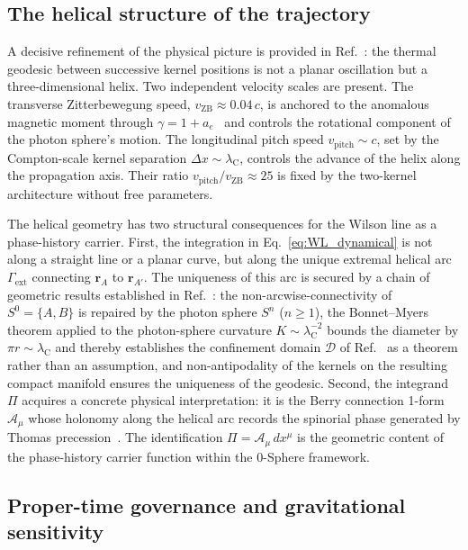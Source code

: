 \documentclass[%
 reprint, amsmath,amssymb, aps, prb, ]{revtex4-2}
\numberwithin{equation}{section}
\newcommand{\lambdaC}{\lambda_{\mathrm{C}}}
\newcommand{\vZB}{v_{\mathrm{ZB}}}
\begin{document}
\subsection{The helical structure of the trajectory}

A decisive refinement of the physical picture is provided in Ref.~\cite{hanamura51}: the thermal geodesic between successive kernel positions is not a planar oscillation but a three-dimensional helix. Two independent velocity scales are present. The transverse Zitterbewegung speed, $\vZB \approx 0.04\,c$, is anchored to the anomalous magnetic moment through $\gamma = 1 + a_e$~\cite{hanamura10, hanamura47} and controls the rotational component of the photon sphere's motion. The longitudinal pitch speed $v_{\text{pitch}} \sim c$, set by the Compton-scale kernel separation $\Delta x \sim \lambdaC$, controls the advance of the helix along the propagation axis. Their ratio $v_{\text{pitch}}/\vZB \approx 25$ is fixed by the two-kernel architecture without free parameters.

The helical geometry has two structural consequences for the Wilson line as a phase-history carrier. First, the integration in Eq.~\eqref{eq:WL_dynamical} is not along a straight line or a planar curve, but along the unique extremal helical arc $\Gamma_{\text{ext}}$ connecting $\mathbf{r}_A$ to $\mathbf{r}_{A'}$. The uniqueness of this arc is secured by a chain of geometric results established in Ref.~\cite{hanamura51}: the non-arcwise-connectivity of $S^0 = \{A,B\}$ is repaired by the photon sphere $S^n$ ($n \geq 1$), the Bonnet--Myers theorem applied to the photon-sphere curvature $K \sim \lambdaC^{-2}$ bounds the diameter by $\pi r \sim \lambdaC$ and thereby establishes the confinement domain $\mathcal{D}$ of Ref.~\cite{hanamura33} as a theorem rather than an assumption, and non-antipodality of the kernels on the resulting compact manifold ensures the uniqueness of the geodesic. Second, the integrand $\Pi$ acquires a concrete physical interpretation: it is the Berry connection 1-form $\mathcal{A}_\mu$ whose holonomy along the helical arc records the spinorial phase generated by Thomas precession~\cite{hanamura26, hanamura29}. The identification $\Pi = \mathcal{A}_\mu\,dx^\mu$ is the geometric content of the phase-history carrier function within the 0-Sphere framework.

\subsection{Proper-time governance and gravitational sensitivity}
\label{sec:propertime}
\end{document}

